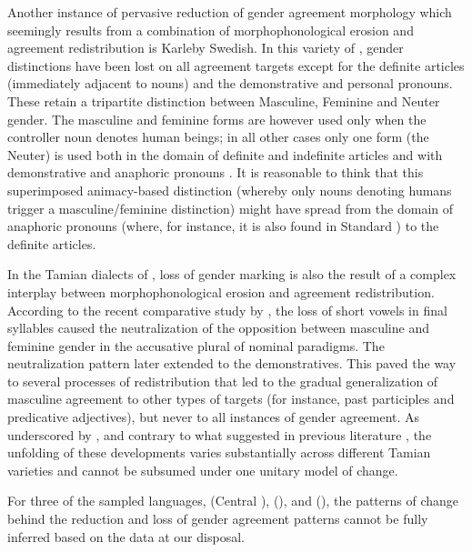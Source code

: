 \documentclass[output=collectionpaper]{langsci/langscibook}
\begin{document}
Another instance of pervasive reduction of gender agreement morphology which seemingly results from a combination of morphophonological erosion and agreement redistribution is Karleby Swedish. In this variety of , gender distinctions have been lost on all agreement targets except for the definite articles (immediately adjacent to nouns) and the demonstrative and personal pronouns. These retain a tripartite distinction between Masculine, Feminine and Neuter gender. The masculine and feminine forms are however used only when the controller noun denotes human beings; in all other cases only one form (the Neuter) is used both in the domain of definite and indefinite articles and with demonstrative and anaphoric pronouns \citep{Hulden1972,Hultman1894}. It is reasonable to think that this superimposed animacy-based distinction (whereby only nouns denoting humans trigger a masculine/feminine distinction) might have spread from the domain of anaphoric pronouns (where, for instance, it is also found in Standard ) to the definite articles.



In the Tamian dialects of , loss of gender marking is also the result of a complex interplay between morphophonological erosion and agreement redistribution. According to the recent comparative study by \citet{Waelchli2017}, the loss of short vowels in final syllables caused the neutralization of the opposition between masculine and feminine gender in the accusative plural of
nominal paradigms. The neutralization pattern later extended to the demonstratives. This paved the way to several processes of redistribution that led to the gradual generalization of masculine agreement to other types of targets (for instance, past participles and predicative adjectives), but never to all instances of gender agreement. As underscored by \citet{Waelchli2017}, and contrary to what suggested in previous literature \citep{Rudzite1980}, the unfolding of these developments varies substantially across different Tamian varieties and cannot be subsumed under one unitary model of change.



For three of the sampled languages,  (Central ),  (), and  (), the patterns of change behind the reduction and loss of gender agreement patterns cannot be fully inferred based on the data at our disposal.
\end{document}

